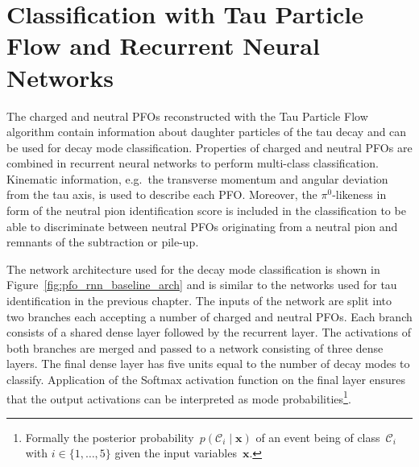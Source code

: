 \section{Classification with Tau Particle Flow and Recurrent Neural Networks}
\label{sec:pfo_general}

The charged and neutral PFOs reconstructed with the Tau Particle Flow algorithm
contain information about daughter particles of the tau decay and can be used
for decay mode classification. Properties of charged and neutral PFOs are
combined in recurrent neural networks to perform multi-class classification.
Kinematic information, e.g.\ the transverse momentum and angular deviation from
the tau axis, is used to describe each PFO. Moreover, the $\pi^0$-likeness in
form of the neutral pion identification score is included in the classification
to be able to discriminate between neutral PFOs originating from a neutral pion
and remnants of the subtraction or pile-up.

The network architecture used for the decay mode classification is shown in
Figure~\ref{fig:pfo_rnn_baseline_arch} and is similar to the networks used for
tau identification in the previous chapter. The inputs of the network are split
into two branches each accepting a number of charged and neutral PFOs. Each
branch consists of a shared dense layer followed by the recurrent layer. The
activations of both branches are merged and passed to a network consisting of
three dense layers. The final dense layer has five units equal to the number of
decay modes to classify. Application of the Softmax activation function on the
final layer ensures that the output activations can be interpreted as mode
probabilities\footnote{Formally the posterior
  probability~$p(\mathcal{C}_i \mid \mathbf{x})$ of an event being of
  class~$\mathcal{C}_i$ with $i \in \{1, \dots, 5 \}$ given the input
  variables~$\mathbf{x}$.}.


